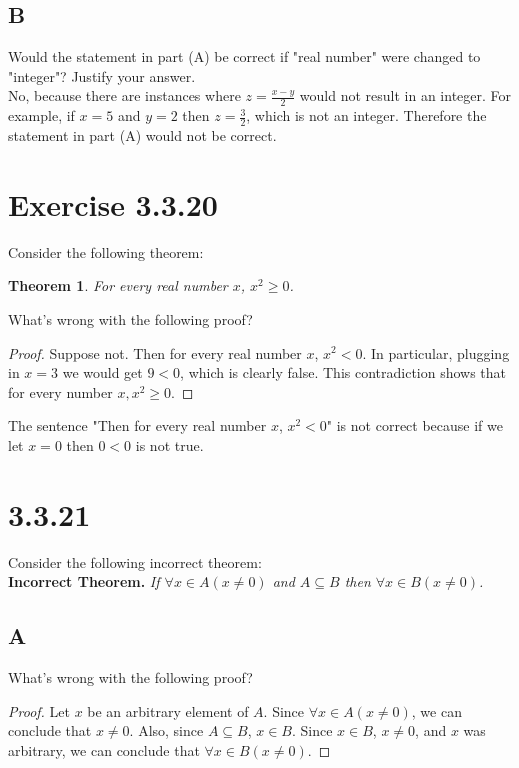 \documentclass{article}
\newcommand{\n}{ \noindent }
\newtheorem*{theorem}{Theorem}  %
\begin{document}
\subsection*{B}
\n Would the statement in part (A) be correct if "real number" were changed to "integer"? Justify your answer. \\

\n No, because there are instances where $z = \tfrac{x - y}{2}$ would not result in an integer. For example, if $x = 5$ and $y = 2$ then $z = \tfrac{3}{2}$, which is not an integer. Therefore the statement in part (A) would not be correct.

\section*{Exercise 3.3.20}
\n Consider the following theorem: \\

\begin{theorem} For every real number $x$, $x^2 \geq 0$.
\end{theorem}

\n What's wrong with the following proof?

\begin{proof}
Suppose not. Then for every real number $x$, $x^2 < 0$. In particular,
plugging in $x = 3$ we would get $9 < 0$, which is clearly false. This
contradiction shows that for every number $x, x^2 \geq 0$.
\end{proof}

\n The sentence "Then for every real number $x$, $x^2 < 0$" is not correct because if we let $x = 0$ then $0 < 0$ is not true.

\section*{3.3.21}
\n Consider the following incorrect theorem: \\

\n \textbf{Incorrect Theorem.} \textit{If $\forall x \in A (x \neq 0)$ and $A \subseteq B$ then $\forall x \in B (x \neq 0)$.}

\subsection*{A}
\n What's wrong with the following proof? \\

\begin{proof}
Let $x$ be an arbitrary element of $A$. Since $\forall x \in A(x \neq 0)$, we can conclude that $x \neq 0$. Also, since $A \subseteq B$, $x \in B$. Since $x \in B$, $x \neq 0$, and $x$ was arbitrary, we can conclude that $\forall x \in B(x \neq 0)$.
\end{proof}
\end{document}
